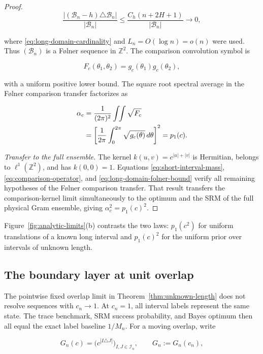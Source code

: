 \begin{proof}
\begin{equation}\label{eq:long-domain-folner-bound}
\frac{|(\mathcal B_n-h)\triangle\mathcal B_n|}{|\mathcal B_n|}
\le
\frac{C_h(n+2H+1)}{|\mathcal B_n|}
\longrightarrow0,
\end{equation}

where \eqref{eq:long-domain-cardinality} and \(L_n=O(\log n)=o(n)\) were
used. Thus \((\mathcal B_n)\) is a Følner sequence in \(\mathbb Z^2\).
The comparison convolution symbol is

\[
F_c(\theta_1,\theta_2)=g_c(\theta_1)g_c(\theta_2),
\]

with a uniform positive lower bound. The square root spectral average in
the Følner comparison transfer factorizes as

\begin{align}\label{eq:endpoint-factorization}
\alpha_c
&=\frac1{(2\pi)^2}\int\!\!\int\sqrt{F_c} \notag\\
&=\left[\frac1{2\pi}\int_0^{2\pi}
\sqrt{g_c(\theta)}\,d\theta\right]^2
=p_1(c).
\end{align}

\emph{Transfer to the full ensemble.}
The kernel \(k(u,v)=c^{|u|+|v|}\) is Hermitian, belongs to
\(\ell^1(\mathbb Z^2)\), and has \(k(0,0)=1\). Equations
\eqref{eq:short-interval-mass}, \eqref{eq:comparison-operator}, and
\eqref{eq:long-domain-folner-bound} verify all remaining hypotheses of
the Følner comparison transfer. That result transfers the
comparison-kernel limit simultaneously to the optimum and the SRM of the full
physical Gram ensemble, giving
\(\alpha_c^2=p_1(c)^2\).
\end{proof}
Figure~\ref{fig:analytic-limits}(b) contrasts the two laws:
$p_1(c^2)$ for uniform translations of a known long interval and
$p_1(c)^2$ for the uniform prior over intervals of unknown length.

\subsection{The boundary layer at unit overlap}
\label{a-nonuniform-boundary-at-unit-overlap}

The pointwise fixed overlap limit in Theorem~\ref{thm:unknown-length} does not
resolve sequences with \(c_n\to1\). At \(c_n=1\), all interval labels
represent the same state. The trace benchmark, SRM success probability, and
Bayes optimum then all equal the exact label baseline \(1/M_n\). For a moving
overlap, write

\begin{equation}\label{eq:moving-physical-gram}
 G_n(c)=\bigl(c^{|I\triangle J|}\bigr)_{I,J\in\mathcal I_n},
 \qquad G_n:=G_n(c_n),
\end{equation}

